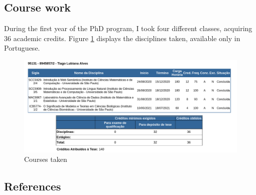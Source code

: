 \hypertarget{course-work}{%
\subsection{Course work}\label{course-work}}

During the first year of the PhD program, I took four different classes, acquiring 36 academic credits.
Figure \ref{fig:courses_taken} displays the disciplines taken, available only in Portuguese.

\begin{figure}
\hypertarget{fig:courses_taken}{%
\centering
\includegraphics{images/janus_courses_taken.png}
\caption{Courses taken}\label{fig:courses_taken}
}
\end{figure}

\hypertarget{references}{%
\subsection{References}\label{references}}

